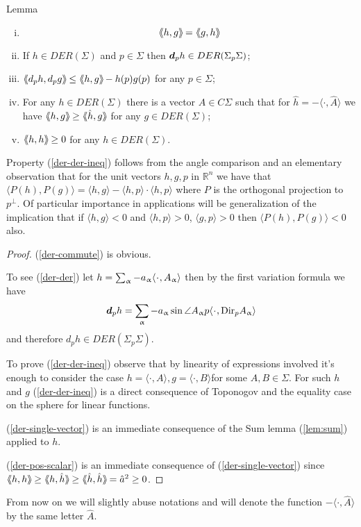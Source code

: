 \begin{thm}{Lemma}\label{der-prop}

\begin{enumerate}[(i)]
\item \label{der-commute}
\[
\hbox{$\langle\hskip-0.25em\langle$} h, g\hbox{$\rangle\hskip-0.25em\rangle\hskip-0.1em$}=\hbox{$\langle\hskip-0.25em\langle$} g, h\hbox{$\rangle\hskip-0.25em\rangle\hskip-0.1em$}
\]
\item \label{der-der} If $h\in DER(\Sigma)$ and $p\in \Sigma$ then $\d_ph\in DER(\Sigma_p\Sigma)$;
\item \label{der-der-ineq} $ \dlang d_ph,d_pg\drang\le \dlang h, g\drang-h(p)g(p)$ for any $p\in\Sigma$;
\item \label{der-single-vector} For any $h\in DER(\Sigma)$ there is a vector $\hat{A}\in C\Sigma$ such that for
 $\hat{h}=-\langle \cdot, \hat{A}\rangle$ we have $\dlang h, g\drang \ge \dlang \hat{h}, g\drang$ for any $g\in DER(\Sigma)$;
 \item \label{der-pos-scalar} $ \dlang h,h \drang\ge   0$ for any $h\in DER(\Sigma)$.
\end{enumerate}
\end{thm}
Property (\ref {der-der-ineq})  follows from the angle comparison and an elementary observation that
for the unit vectors $h,g,p$ in $\mathbb R^n$ we have that $\langle P(h),P(g)\rangle=\langle h,g\rangle-\langle h,p\rangle\cdot \langle h,p\rangle$ where $P$ is the orthogonal projection to $p^\perp$. Of particular importance in  applications will be generalization of  the implication that if $\langle h,g\rangle<0$ and $\langle h,p\rangle>0$, $\langle g,p\rangle>0$ then $\langle P(h),P(g)\rangle<0$ also.

\begin{proof}
(\ref{der-commute}) is obvious.

  To see (\ref{der-der})  let  $h=\sum_\a -a_\a\langle \cdot, {A_\a}\rangle$ then by the first variation formula we have
  \[\d_ph=\sum_\a -a_\a\sin \angle A_\a p \langle \cdot, \Dir{p}{A_\a}\rangle\]
and therefore $d_ph\in DER(\Sigma_p\Sigma)$.

To prove (\ref{der-der-ineq}) observe that  by linearity of expressions involved it's enough to consider the case $h= \langle \cdot, {A}\rangle, g= \langle \cdot, {B}\rangle$for some $A,B\in\Sigma$. For such $h$ and $g$   (\ref{der-der-ineq})  is a direct consequence of Toponogov and the equality case on the sphere for linear functions.

(\ref{der-single-vector}) is an immediate consequence of the  Sum lemma (\ref{lem:sum}) applied to $h$.

(\ref{der-pos-scalar})  is an immediate consequence of (\ref{der-single-vector}) since $ \dlang h,h \drang\ge  \dlang h,\hat h \drang  \ge \dlang \hat h,\hat h \drang={\hat a}^2\ge 0$.
\end{proof}
From now on we will slightly abuse notations and will denote the function $-\langle \cdot, \hat{A}\rangle$ by the same letter $\hat A$.
